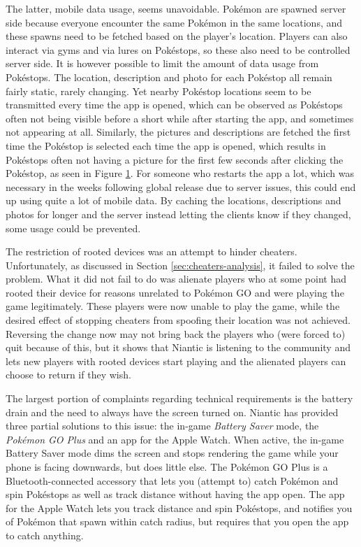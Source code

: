 The latter, mobile data usage, seems unavoidable. Pokémon are spawned server side because everyone encounter the same Pokémon in the same locations, and these spawns need to be fetched based on the player's location. Players can also interact via gyms and via lures on Pokéstops, so these also need to be controlled server side. It is however possible to limit the amount of data usage from Pokéstops. The location, description and photo for each Pokéstop all remain fairly static, rarely changing. Yet nearby Pokéstop locations seem to be transmitted every time the app is opened, which can be observed as Pokéstops often not being visible before a short while after starting the app, and sometimes not appearing at all. Similarly, the pictures and descriptions are fetched the first time the Pokéstop is selected each time the app is opened, which results in Pokéstops often not having a picture for the first few seconds after clicking the Pokéstop, as seen in Figure \ref{fig:blank-pokestop}. For someone who restarts the app a lot, which was necessary in the weeks following global release due to server issues, this could end up using quite a lot of mobile data. By caching the locations, descriptions and photos for longer and the server instead letting the clients know if they changed, some usage could be prevented.

\begin{figure}[h]
	\centering
	\caption{}
	\label{fig:blank-pokestop}
\end{figure}

The restriction of rooted devices was an attempt to hinder cheaters. Unfortunately, as discussed in Section \ref{sec:cheaters-analysis}, it failed to solve the problem. What it did not fail to do was alienate players who at some point had rooted their device for reasons unrelated to Pokémon GO and were playing the game legitimately. These players were now unable to play the game, while the desired effect of stopping cheaters from spoofing their location was not achieved. Reversing the change now may not bring back the players who (were forced to) quit because of this, but it shows that Niantic is listening to the community and lets new players with rooted devices start playing and the alienated players can choose to return if they wish.

The largest portion of complaints regarding technical requirements is the battery drain and the need to always have the screen turned on. Niantic has provided three partial solutions to this issue: the in-game \emph{Battery Saver} mode, the \emph{Pokémon GO Plus} and an app for the Apple Watch. When active, the in-game Battery Saver mode dims the screen and stops rendering the game while your phone is facing downwards, but does little else. The Pokémon GO Plus is a Bluetooth-connected accessory that lets you (attempt to) catch Pokémon and spin Pokéstops as well as track distance without having the app open. The app for the Apple Watch lets you track distance and spin Pokéstops, and notifies you of Pokémon that spawn within catch radius, but requires that you open the app to catch anything.

